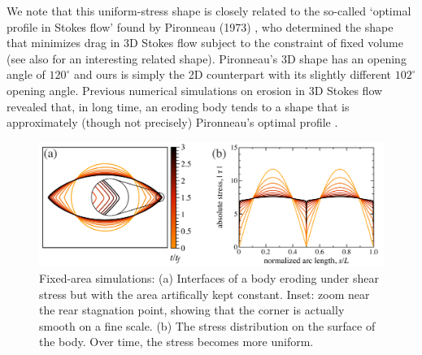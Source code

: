 \documentclass[preprint, 10pt]{elsarticle}
\begin{document}
 
We note that this uniform-stress shape is closely related to the so-called `optimal profile in Stokes flow' found by Pironneau (1973) \cite{pir1973}, who determined the shape that minimizes drag in 3D Stokes flow subject to the constraint of fixed volume (see also \cite{mon-lau2015} for an interesting related shape). Pironneau's 3D shape has an opening angle of $120^{\circ}$ and ours is simply the 2D counterpart with its slightly different $102^{\circ}$ opening angle. Previous numerical simulations on erosion in 3D Stokes flow revealed that, in long time, an eroding body tends to a shape that is approximately (though not precisely) Pironneau's optimal profile \cite{mit-spa2016}.

\begin{figure}%
\begin{center}
\includegraphics[width = 0.85 \textwidth]{./figs/fixed_intface.pdf}
\caption{Fixed-area simulations: (a) Interfaces of a body eroding under shear stress but with the area artifically kept constant. Inset: zoom near the rear stagnation point, showing that the corner is actually smooth on a fine scale. (b) The stress distribution on the surface of the body. Over time, the stress becomes more uniform.}
\label{fixed_intface}
\end{center}
\end{figure}
\end{document}

